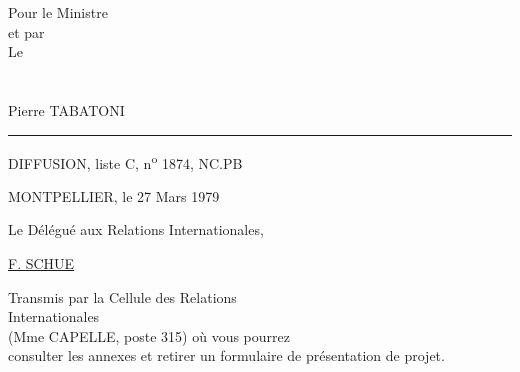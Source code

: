 \begin{flushright}
Pour le Ministre\\
et par \\
Le \\
\\
\\
Pierre TABATONI
\end{flushright}


\hrule
\medskip
DIFFUSION, liste C, n\textsuperscript{o} 1874, NC.PB

MONTPELLIER, le 27 Mars 1979

Le Délégué aux Relations Internationales,


\uline{F. SCHUE}

\begin{flushright}
Transmis par la Cellule des Relations\\
Internationales\\
(Mme CAPELLE, poste 315) où vous pourrez\\
consulter les annexes et retirer un formulaire de présentation de projet.
\end{flushright}
